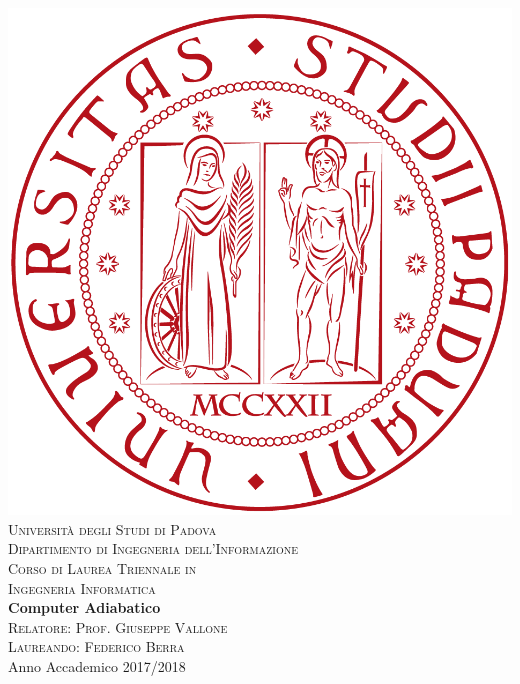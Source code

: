 \begin{titlepage}
\begin{center}
\includegraphics[scale=0.08]{Immagini/logo.png}\\[1.5cm]
\textsc{\LARGE Universit\`{a} degli Studi di Padova}\\[1.2cm]
\textsc{\Large Dipartimento di Ingegneria dell'Informazione}\\[0.8cm]
\textsc{\Large Corso di Laurea Triennale in}\\[0.5cm]
\textsc{\Large Ingegneria Informatica}\\[2cm]
{ \LARGE \bfseries Computer Adiabatico}\\[2cm]
\textsc{\large Relatore: Prof. Giuseppe Vallone}\\[0.5cm]
\textsc{\large Laureando: Federico Berra}\\
\vfill
{\large Anno Accademico 2017/2018}
\end{center}
\end{titlepage}
